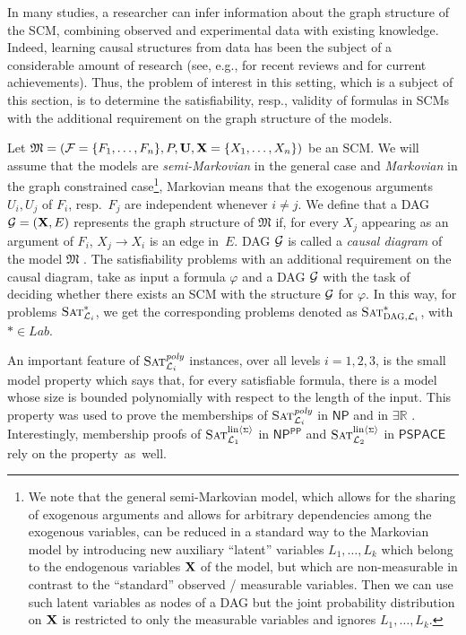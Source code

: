 \documentclass[a4paper,UKenglish,cleveref, autoref, thm-restate]{lipics-v2021}
\newcommand{\IR}{\mathbb{R}}
\newcommand{\existsR}{\ensuremath{\mathsf{\exists\IR}}}
\newcommand{\NP}{\ensuremath{\mathsf{NP}}}
\newcommand{\PSPACE}{\ensuremath{\mathsf{PSPACE}}}
\newcommand{\ccPP}{\ensuremath{\mathsf{PP}}}
\newcommand{\cL}{{\mathcal L}}
\newcommand{\cF}{{\mathcal F}}
\newcommand{\fM}{{\mathfrak M}}
\newcommand{\bU}{{\bf U}}
\newcommand{\bX}{{\bf X}}
\newcommand{\cG}{{\cal G}}
\def\probsumname#1#2{^{\text{#1}{\langle{\scriptscriptstyle\Sigma}\rangle}}_{\text{#2}}}
\def\Lab{\textit{Lab}}
\newcommand{\SATistar}{\mbox{\sc Sat}^{*}_{\cL_i}}
\newcommand{\SATipoly}{\mbox{\sc Sat}^{\textit{poly}}_{{\cL_i}}}
\newcommand{\SATistargraph}{\mbox{\sc Sat}^{*}_{\mbox{\scriptsize\sc DAG}, {\cL_i}}}
\newcommand{\SATproblinsum}{\mbox{\sc Sat}\probsumname{lin}{${\cal L}_1$}}
\newcommand{\SATinterventlinsum}{\mbox{\sc Sat}\probsumname{lin}{${\cal L}_2$}}
\begin{document}
In many studies, a researcher can infer information about the graph structure of the 
SCM, combining observed and experimental data with existing knowledge. 
Indeed, learning causal structures from data has been the subject of a considerable 
amount of research (see, e.g., \cite{drton2017structure,glymour2019review,squires2022causal}
for recent reviews and \cite{reisach2021beware,ng2021reliable,lu2021improving,rolland2022score,reisach2023scale} for current achievements). Thus, the problem of interest in this setting, which is a subject of this section, 
is to determine the satisfiability, resp., validity of formulas in SCMs with the additional 
requirement on the graph structure of the models. 


Let $\fM=(\cF=\{F_1,\ldots,F_n\}, P, \bU, \bX=\{X_1,\ldots,X_n\})$ be an SCM.
We will assume that the models are \emph{semi-Markovian} in the general case and \emph{Markovian} in the graph constrained case\footnote{We note that 
the general semi-Markovian model,  which allows 
for the sharing of exogenous arguments and allows for arbitrary dependencies among 
the exogenous variables, can be reduced in a standard way to the Markovian model by 
introducing new auxiliary ``latent'' variables $L_1,\ldots,L_k$ which belong to the endogenous variables $\bX$ of the model, but which are non-measurable in contrast to the ``standard'' observed / measurable variables. Then we can use such latent variables as nodes of a DAG but the joint probability distribution on $\bX$ is restricted  to only the measurable variables and ignores $L_1,\ldots,L_k$.
}, 
Markovian means that the exogenous arguments $U_i, U_j$ of $F_i$, resp.~$F_j$ are independent whenever 
$i \not= j$. We define that a DAG $\cG = (\bX, E)$ represents the graph structure of $\fM$ if, 
for every $X_j$ appearing as an argument of $F_i$, $X_j \to X_i$ is an edge in~$E$.
DAG $\cG$ is called a \emph{causal diagram} of the model $\fM$ \cite{Pearl2009,bareinboim2022pearl}.
The satisfiability problems with an additional requirement on the causal diagram, 
take as input a formula $\varphi$ and a DAG $\cG$ with the task of deciding whether there exists an SCM
with the structure $\cG$ for $\varphi$. In this way, for problems $\SATistar$, we 
get the corresponding problems denoted as $\SATistargraph$, with  $*\in \Lab$.


An important feature of $\SATipoly$ instances, over all levels $i=1,2,3$, is the small 
model property which says that, for every satisfiable formula, there is a model whose size is 
bounded polynomially with respect to the length of the input. This property 
was used
to prove the memberships of $\SATipoly$ in $\NP$ and in $\existsR$
\citep{fagin1990logic,ibeling2020probabilistic,ibeling2022mosse,IBELING2024103339}.
Interestingly, membership proofs of $\SATproblinsum${} in \NP$^{\ccPP}$ and  $\SATinterventlinsum$ in $\PSPACE$  \citep{doerflerICLR2025} 
rely on the property~as~well.
\end{document}
